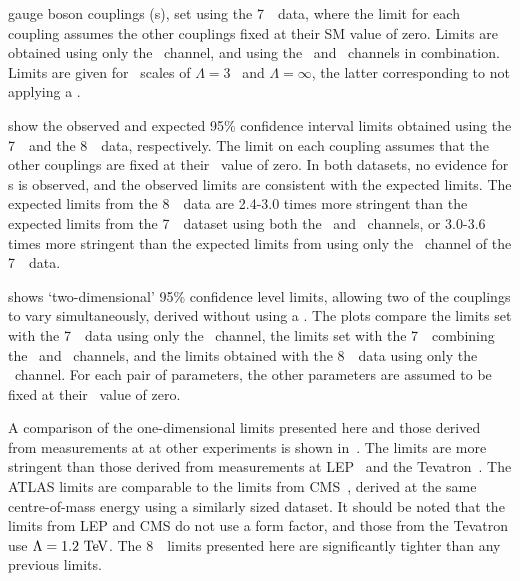 \begin{table}[htbp]
{           gauge boson couplings (\TGC s), set using the 7~\tev\ data, where 
           the limit for each coupling assumes the other couplings
           fixed at their SM value of zero. Limits are obtained using only the
           \ZZllll\ channel, and using the \ZZllll\ and \ZZllvv\ channels in
           combination.  Limits are given for \formfactor\ scales of $\Lambda =
           3$ \TeV\ and $\Lambda = \infty$, the latter corresponding to not
           applying a \formfactor. 
           }
           \label{table:TGC-obs-exp-limits-seven}
\end{table}

 show the observed and
expected 95\% confidence interval limits obtained using the 7~\tev\ and the
8~\tev\ data, respectively. The limit on each coupling assumes that the other
couplings are fixed at their \sm\ value of zero. In both datasets, no evidence
for \TGC s is observed, and the observed limits are consistent with the expected
limits. The expected limits from the 8~\tev\ data are 2.4-3.0 times more
stringent than the expected limits from the 7~\tev\ dataset using both the
\ZZllll\ and \ZZllvv\ channels, or 3.0-3.6 times more stringent than the
expected limits from using only the \ZZllll\ channel of the 7~\tev\ data.

 shows `two-dimensional' 95\% confidence level limits,
allowing two of the couplings to vary simultaneously, derived without using a
\formfactor. The plots compare the limits set with the 7~\tev\ data using only
the \ZZllll\ channel, the limits set with the 7~\tev\ combining the \ZZllll\ and
\ZZllvv\ channels, and the limits obtained with the 8~\tev\ data using only the
\ZZllll\ channel. For each pair of parameters, the other parameters are assumed to be
fixed at their \sm\ value of zero. 


A comparison of the one-dimensional limits presented here and those derived from
measurements at at other experiments is shown in~. The
limits are more stringent than those derived from measurements at
LEP~\cite{bib:LEPEW2006} and the Tevatron~\cite{Abazov:2007ad}.
The ATLAS  limits are comparable to the limits from
CMS~\cite{CMS:2012rg}, derived at the same centre-of-mass energy using a
similarly sized dataset. It should be noted that the limits from LEP and CMS do
not use a form factor, and those from the Tevatron use $\Lambda = 1.2\TeV$.  The
8~\tev\ limits presented here are significantly tighter than any previous
limits.

